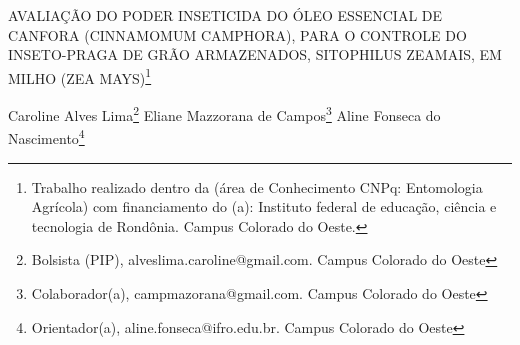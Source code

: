 \documentclass[article,12pt,onesidea,4paper,english,brazil]{abntex2}
\begin{document}
	
	
	\frenchspacing 
	
	\begin{center}
		\LARGE AVALIAÇÃO DO PODER INSETICIDA DO ÓLEO ESSENCIAL DE CANFORA \MakeUppercase{(Cinnamomum camphora)}, PARA O CONTROLE DO INSETO-PRAGA DE GRÃO ARMAZENADOS, \MakeUppercase{Sitophilus zeamais}, EM MILHO \MakeUppercase{(Zea mays)}\footnote{Trabalho realizado dentro da (área de Conhecimento CNPq: Entomologia Agrícola) com
			financiamento do (a): Instituto federal de educação, ciência e tecnologia de Rondônia. Campus
			Colorado do Oeste.}
		
		\normalsize
		Caroline Alves Lima\footnote{Bolsista (PIP), alveslima.caroline@gmail.com. Campus Colorado do Oeste} 
		Eliane Mazzorana de Campos\footnote{Colaborador(a), campmazorana@gmail.com. Campus Colorado do Oeste} 
		Aline Fonseca do Nascimento\footnote{Orientador(a), aline.fonseca@ifro.edu.br. Campus Colorado do Oeste} 
		
	\end{center}
	 
\end{document}
